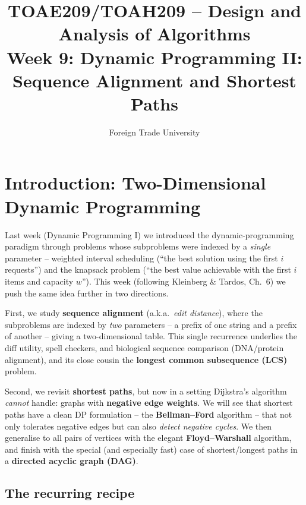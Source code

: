 \documentclass[11pt]{article}
\title{TOAE209/TOAH209 -- Design and Analysis of Algorithms\\[4pt]
\large Week 9: Dynamic Programming II: Sequence Alignment and Shortest Paths}
\author{Foreign Trade University}
\date{}
\begin{document}
\maketitle
\tableofcontents

\section{Introduction: Two-Dimensional Dynamic Programming}

Last week (Dynamic Programming I) we introduced the dynamic-programming paradigm through
problems whose subproblems were indexed by a \emph{single} parameter -- weighted interval
scheduling (``the best solution using the first $i$ requests'') and the knapsack problem
(``the best value achievable with the first $i$ items and capacity $w$''). This week
(following Kleinberg \& Tardos, Ch.\ 6) we push the same idea further in two directions.

First, we study \textbf{sequence alignment} (a.k.a.\ \emph{edit distance}), where the
subproblems are indexed by \emph{two} parameters -- a prefix of one string and a prefix of
another -- giving a two-dimensional table. This single recurrence underlies the diff
utility, spell checkers, and biological sequence comparison (DNA/protein alignment), and
its close cousin the \textbf{longest common subsequence (LCS)} problem.

Second, we revisit \textbf{shortest paths}, but now in a setting Dijkstra's algorithm
\emph{cannot} handle: graphs with \textbf{negative edge weights}. We will see that
shortest paths have a clean DP formulation -- the \textbf{Bellman--Ford} algorithm -- that
not only tolerates negative edges but can also \emph{detect negative cycles}. We then
generalise to all pairs of vertices with the elegant \textbf{Floyd--Warshall} algorithm,
and finish with the special (and especially fast) case of shortest/longest paths in a
\textbf{directed acyclic graph (DAG)}.

\subsection{The recurring recipe}
\end{document}
